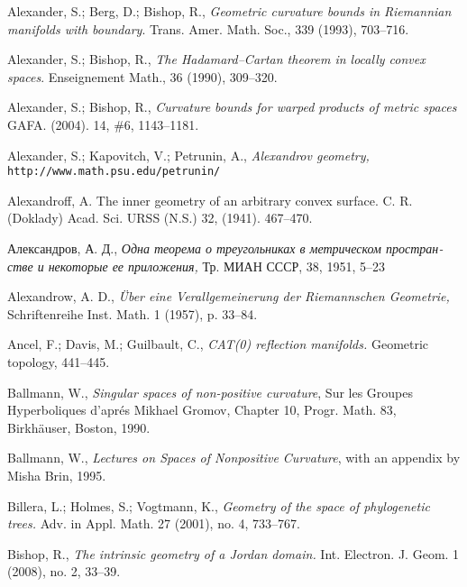 \begin{thebibliography}{52}

Alexander, S.; Berg, D.; Bishop, R., 
\textit{Geometric curvature bounds in Riemannian manifolds with boundary}. 
Trans. Amer. Math. Soc., 339 (1993), 703--716.

Alexander, S.; 
Bishop, R., 
\textit{The Hadamard--Cartan theorem in locally convex spaces}. 
Enseignement Math., 
36 
(1990), 
309--320.

Alexander, S.; 
Bishop, R., 
\textit{Curvature bounds for warped products of metric spaces}
GAFA. 
(2004).
14, 
\#6, 
1143--1181.

Alexander, S.;
Kapovitch, V.;
Petrunin, A.,
\textit{Alexandrov geometry,}
 \texttt{http://www.math.psu.edu/petrunin/}
 
 Alexandroff, A.
The inner geometry of an arbitrary convex surface.
C. R. (Doklady) Acad. Sci. URSS (N.S.) 32, (1941). 467--470.

\begin{otherlanguage}{russian}
Александров, А. Д.,
\textit{Одна теорема о треугольниках в метрическом пространстве и некоторые ее приложения,}
Тр. МИАН СССР, 38, 1951, 5--23
\end{otherlanguage}


 Alexandrow, A. D.,  \textit{\"Uber eine Verallgemeinerung der Riemannschen Geometrie,}
Schriftenreihe Inst. Math. 
1 
(1957), 
p. 33--84.

 Ancel, F.; Davis, M.; Guilbault, C.,
\textit{CAT(0) reflection manifolds.} 
Geometric topology, 
441--445.

Ballmann, W., 
\textit{Singular spaces of non-positive curvature}, 
Sur les Groupes Hyperboliques d'apr\'{e}s Mikhael Gromov, Chapter 10, Progr. Math. 83, Birkh\"auser, Boston, 1990. 

Ballmann, W., \textit{Lectures on Spaces of Nonpositive Curvature},
with an appendix by Misha Brin, 1995. 

Billera, L.; 
Holmes, S.; 
Vogtmann, K., 
\textit{Geometry of the space of phylogenetic trees.}
Adv. in Appl. Math. 
27 
(2001), 
no. 4, 
733--767.

Bishop, R., 
\textit{The intrinsic geometry of a Jordan domain.} 
Int. Electron. J. Geom. 
1 
(2008), 
no. 2, 
33--39.


\end{thebibliography}
